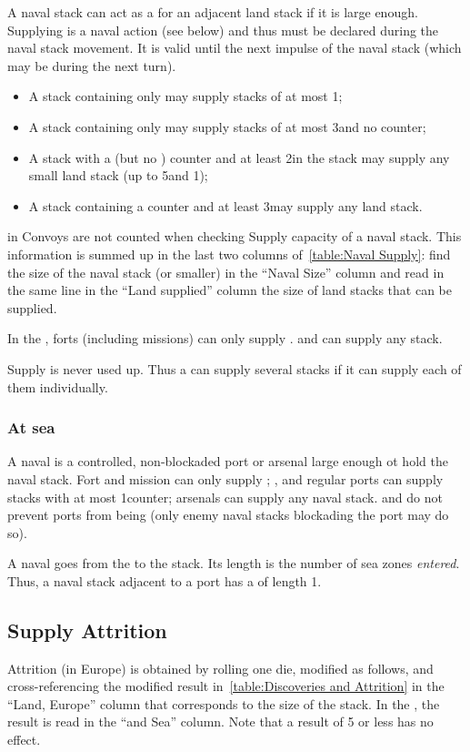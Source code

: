 A naval stack can act as a \SoS for an adjacent land stack if it is large
enough. Supplying is a naval action (see below) and thus must be declared
during the naval stack movement. It is valid until the next impulse of the
naval stack (which may be during the next turn).
\begin{itemize}
\item A stack containing only \NDE may supply stacks of at most 1\LD;
\item A stack containing only \ND may supply stacks of at most 3\LD and no
  \ARMY counter;
\item A stack with a \FLEET\facemoins (but no \FLEET\faceplus) counter and at
  least 2\ND in the stack may supply any small land stack (up to 5\LD and
  1\Pasha);
\item A stack containing a \FLEET\faceplus counter and at least 3\ND may
  supply any land stack.
\end{itemize}
\NTD in Convoys are not counted when checking Supply capacity of a naval
stack. This information is summed up in the last two columns
of~\ref{table:Naval Supply}: find the size of the naval stack (or smaller) in
the ``Naval Size'' column and read in the same line in the ``Land supplied''
column the size of land stacks that can be supplied.


In the \ROTW, forts (including missions) can only supply \LD. \TP and \COL can
supply any stack.

Supply is never used up. Thus a \SoS can supply several stacks if it can
supply each of them individually.

\subsubsection{At sea}
A naval \SoS is a controlled, non-blockaded port or arsenal large enough ot
hold the naval stack. Fort and mission can only supply \ND; \TP, \COL and
regular ports can supply stacks with at most 1\FLEET counter; arsenals can
supply any naval stack. \Presidios and \USURE do not prevent ports from being
\SoS (only enemy naval stacks blockading the port may do so).

A naval \LoS goes from the \SoS to the stack. Its length is the number of sea
zones \emph{entered}. Thus, a naval stack adjacent to a port has a \LoS of
length 1.

\subsection{Supply Attrition}
Attrition (in Europe) is obtained by rolling one die, modified as follows, and
cross-referencing the modified result in~\ref{table:Discoveries and Attrition}
in the ``Land, Europe'' column that corresponds to the size of the stack. In
the \ROTW, the result is read in the ``\ROTW and Sea'' column. Note that a
result of 5 or less has no effect.

